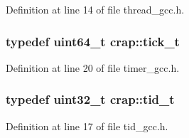 Definition at line 14 of file thread\+\_\+gcc.\+h.

\hypertarget{namespacecrap_ad017b1c2078d1f4d59557eda5d95b149}{
\subsubsection[{tick\+\_\+t}]{\setlength{\rightskip}{0pt plus 5cm}typedef uint64\+\_\+t {\bf crap\+::tick\+\_\+t}}}\label{namespacecrap_ad017b1c2078d1f4d59557eda5d95b149}


Definition at line 20 of file timer\+\_\+gcc.\+h.

\hypertarget{namespacecrap_ac21fdaa6d61c6dfcc98ddbb9fd7566ca}{
\subsubsection[{tid\+\_\+t}]{\setlength{\rightskip}{0pt plus 5cm}typedef uint32\+\_\+t {\bf crap\+::tid\+\_\+t}}}\label{namespacecrap_ac21fdaa6d61c6dfcc98ddbb9fd7566ca}


Definition at line 17 of file tid\+\_\+gcc.\+h.




